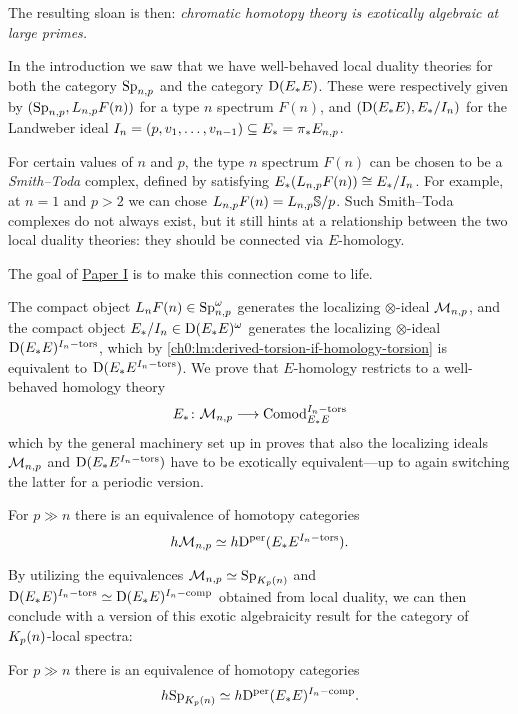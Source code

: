 The resulting sloan is then: \emph{chromatic homotopy theory is exotically algebraic at large primes.} 

In the introduction we saw that we have well-behaved local duality theories for both the category $\mathrm{Sp}_{n,p}$ and the category $\mathrm{D}(E_*E)$. These were respectively given by $(\mathrm{Sp}_{n,p}, L_{n,p} F(n))$ for a type $n$ spectrum $F(n)$, and $(\mathrm{D}(E_*E), E_*/I_n)$ for the Landweber ideal $I_n=(p, v_1, \ldots, v_{n-1})\subseteq E_*= \pi_* E_{n,p}$.

For certain values of $n$ and $p$, the type $n$ spectrum $F(n)$ can be chosen to be a \emph{Smith--Toda} complex, defined by satisfying $E_*(L_{n,p} F(n)) \cong E_*/I_n$. For example, at $n=1$ and $p>2$ we can chose $L_{n,p} F(n) = L_{n,p}\mathbb{S}/p$. Such Smith--Toda complexes do not always exist, but it still hints at a relationship between the two local duality theories: they should be connected via $E$-homology. 

The goal of \hyperref[ch1]{Paper I} is to make this connection come to life. 

The compact object $L_n F(n)\in \mathrm{Sp}_{n,p}^\omega$ generates the localizing $\otimes$-ideal $\mathcal{M}_{n,p}$, and the compact object $E_*/I_n \in \mathrm{D}(E_*E)^\omega$ generates the localizing $\otimes$-ideal $\mathrm{D}(E_*E)^{I_n-\mathrm{tors}}$, which by \cref{ch0:lm:derived-torsion-if-homology-torsion} is equivalent to $\mathrm{D}(E_*E^{I_n-\mathrm{tors}})$. We prove that $E$-homology restricts to a well-behaved homology theory 
\[E_*\colon \mathcal{M}_{n,p}\longrightarrow \mathrm{Comod}_{E_*E}^{I_n-\mathrm{tors}}\] 
which by the general machinery set up in \cite{patchkoria-pstragowski_2021} proves that also the localizing ideals $\mathcal{M}_{n,p}$ and $\mathrm{D}(E_*E^{I_n-\mathrm{tors}})$ have to be exotically equivalent---up to again switching the latter for a periodic version. 

\begin{theorem}
    \label{ch0:summary1:thm:B}
    For $p\gg n$ there is an equivalence of homotopy categories
    \[h \mathcal{M}_{n,p} \simeq h \mathrm{D}^{\mathrm{per}}(E_*E^{I_n-\mathrm{tors}}).\]
\end{theorem}

By utilizing the equivalences $\mathcal{M}_{n,p} \simeq \mathrm{Sp}_{K_p(n)}$ and $\mathrm{D}(E_*E)^{I_n-\mathrm{tors}} \simeq \mathrm{D}(E_*E)^{I_n-\mathrm{comp}}$ obtained from local duality, we can then conclude with a version of this exotic algebraicity result for the category of ${K_p(n)}$-local spectra: 

\begin{theorem}
    \label{ch0:summary1:thm:A}
    For $p \gg n$ there is an equivalence of homotopy categories
    \[h \mathrm{Sp}_{K_p(n)} \simeq h \mathrm{D}^{\mathrm{per}}(E_*E)^{I_n-\mathrm{comp}}.\]
\end{theorem}

